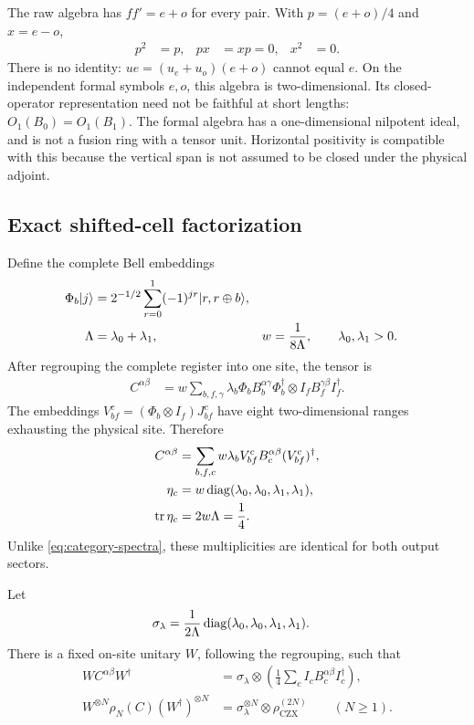 The raw algebra has $ff'=e+o$ for every pair. With
$p=(e+o)/4$ and $x=e-o$,
\begin{align}
	p^2 & =p, & px & =xp=0, & x^2 & =0.
\end{align}
There is no identity: $ue=(u_e+u_o)(e+o)$ cannot equal $e$.
On the independent formal symbols $e,o$, this algebra is two-dimensional.
Its closed-operator representation need not be faithful at short lengths:
$O_1(B_0)=O_1(B_1)$. The formal algebra has a one-dimensional nilpotent
ideal, and is not a fusion ring with a tensor unit. Horizontal
positivity is compatible with this because the vertical span is
not assumed to be closed under the physical adjoint.

\subsection{Exact shifted-cell factorization}

Define the complete Bell embeddings
\begin{align}
	\Phi_b\lvert j\rangle
	        & =2^{-1/2}\sum_{r=0}^1(-1)^{jr}\lvert r,r\oplus b\rangle,   \\
	\Lambda & =\lambda_0+\lambda_1,                            &
	w       & =\frac1{8\Lambda},
	\qquad \lambda_0,\lambda_1>0.
\end{align}
After regrouping the complete register into one site, the tensor is
\begin{align}
	C^{\alpha\beta}
	 & =w\sum_{b,f,\gamma}\lambda_b
	\Phi_bB_b^{\alpha\gamma}\Phi_b^\dagger
	\otimes I_fB_f^{\gamma\beta}I_f^\dagger.
\end{align}
The embeddings $V_{bf}^c=(\Phi_b\otimes I_f)J_{bf}^c$ have
eight two-dimensional ranges exhausting the physical site.
Therefore
\begin{align}
	C^{\alpha\beta}
	          & =\sum_{b,f,c}w\lambda_b
	V_{bf}^cB_c^{\alpha\beta}(V_{bf}^c)^\dagger,                  \\
	\eta_c
	          & =w\operatorname{diag}(\lambda_0,\lambda_0,\lambda_1,\lambda_1), \\
	\operatorname{tr}\eta_c & =2w\Lambda=\frac14.
	\label{eq:CZX-eta}
\end{align}
Unlike \cref{eq:category-spectra}, these multiplicities are
identical for both output sectors.

\begin{proposition}
	\label{prop:CZX-separation}
	Let
	\begin{align}
		\sigma_\lambda
		 & =\frac1{2\Lambda}
		\operatorname{diag}(\lambda_0,\lambda_0,\lambda_1,\lambda_1).
	\end{align}
	There is a fixed on-site unitary $W$, following the regrouping,
	such that
	\begin{align}
		WC^{\alpha\beta}W^\dagger
		 & =\sigma_\lambda\otimes
		\left(\frac14\sum_c I_cB_c^{\alpha\beta}I_c^\dagger\right), \\
		W^{\otimes N}\rho_N(C)(W^\dagger)^{\otimes N}
		 & =\sigma_\lambda^{\otimes N}
		\otimes\rho_{\mathrm{CZX}}^{(2N)}
		\qquad(N\geq1).
		\label{eq:CZX-separation}
	\end{align}
\end{proposition}

